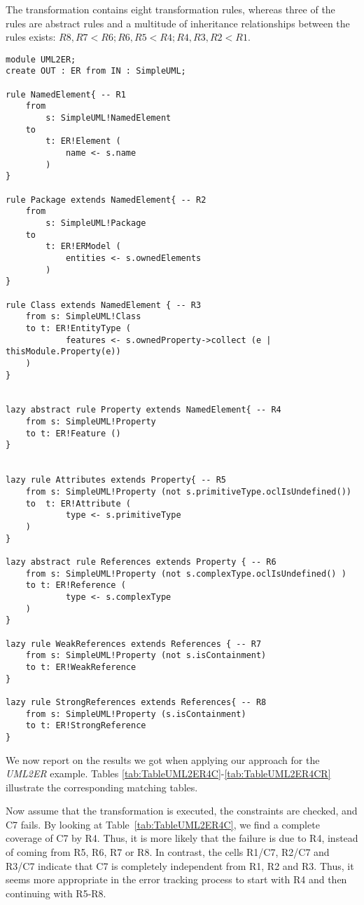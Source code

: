 The transformation contains eight transformation rules, whereas three of the rules are abstract rules and a multitude of inheritance relationships between the rules exists: $R8, R7 < R6; R6, R5 < R4; R4, R3, R2 < R1$.

\begin{lstlisting}[numbers=none]
module UML2ER;
create OUT : ER from IN : SimpleUML;

rule NamedElement{ -- R1
	from
		s: SimpleUML!NamedElement
	to
		t: ER!Element (
			name <- s.name	
		)	
}

rule Package extends NamedElement{ -- R2
	from
		s: SimpleUML!Package
	to
		t: ER!ERModel (
			entities <- s.ownedElements	
		)
}

rule Class extends NamedElement { -- R3
	from s: SimpleUML!Class
	to t: ER!EntityType (
			features <- s.ownedProperty->collect (e | thisModule.Property(e))
    )
}


lazy abstract rule Property extends NamedElement{ -- R4
	from s: SimpleUML!Property
	to t: ER!Feature ()
}


lazy rule Attributes extends Property{ -- R5
	from s: SimpleUML!Property (not s.primitiveType.oclIsUndefined())
	to	t: ER!Attribute (
			type <- s.primitiveType	
	)
}

lazy abstract rule References extends Property { -- R6
	from s: SimpleUML!Property (not s.complexType.oclIsUndefined() )
	to t: ER!Reference (
			type <- s.complexType
	)
}

lazy rule WeakReferences extends References { -- R7
	from s: SimpleUML!Property (not s.isContainment)
	to t: ER!WeakReference
}

lazy rule StrongReferences extends References{ -- R8
	from s: SimpleUML!Property (s.isContainment)
	to t: ER!StrongReference
}
\end{lstlisting}

We now report on the results we got when applying our approach for the \emph{UML2ER} example. Tables \ref{tab:TableUML2ER4C}-\ref{tab:TableUML2ER4CR} illustrate the corresponding matching tables.

Now assume that the transformation is executed, the constraints are checked, and C7 fails. By looking at Table~\ref{tab:TableUML2ER4C}, we find a complete coverage of C7 by R4. Thus, it is more likely that the failure is due to R4, instead of coming from R5, R6, R7 or R8. In contrast, the cells R1/C7, R2/C7 and R3/C7 indicate that C7 is completely independent from R1, R2 and R3. Thus, it seems more appropriate in the error tracking process to start with R4 and then continuing with R5-R8.

